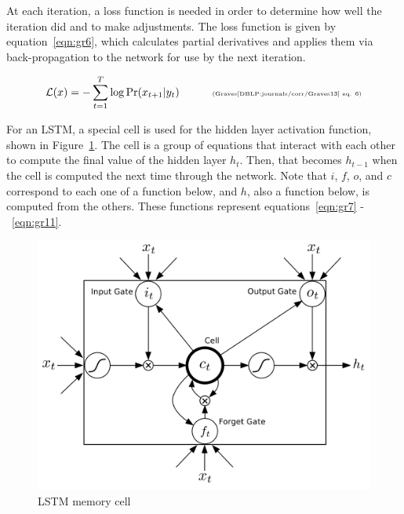 \documentclass{article}
\begin{document}
At each iteration, a loss function is needed in order to determine how well the iteration did and to make adjustments. The loss function is given by equation~\ref{eqn:gr6}, which calculates partial derivatives and applies them via back-propagation to the network for use by the next iteration.

    \begin{equation}
        \label{eqn:gr6}  
        \mathcal{L}(x) = -\sum_{t=1}^T\log\text{Pr}(x_{t+1}\vert y_t) \quad\quad\quad \text{\tiny{(Graves\cite{DBLP:journals/corr/Graves13} eq. 6)}}
    \end{equation}

For an LSTM, a special cell is used for the hidden layer activation function, shown in Figure~\ref{fig:cell}. The cell is a group of equations that interact with each other to compute the final value of the hidden layer $h_{t}$. Then, that becomes $h_{t-1}$ when the cell is computed the next time through the network. Note that $i$, $f$, $o$, and $c$ correspond to each one of a function below, and $h$, also a function below, is computed from the others. These functions represent equations~\ref{eqn:gr7} -~\ref{eqn:gr11}.

    \begin{figure}[hbt!]
        \includegraphics[width=12cm]{graphics/LSTM-Memory-Cell.png}
        \centering
        \caption{LSTM memory cell}
        \label{fig:cell}
    \end{figure}
    
\end{document}
